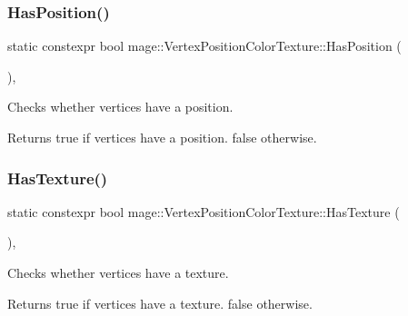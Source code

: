 \subsubsection{\texorpdfstring{Has\+Position()}{HasPosition()}}
{\footnotesize\ttfamily static constexpr bool mage\+::\+Vertex\+Position\+Color\+Texture\+::\+Has\+Position (\begin{DoxyParamCaption}{ }\end{DoxyParamCaption})\hspace{0.3cm}{\ttfamily [static]}, {\ttfamily [noexcept]}}

Checks whether vertices have a position.

\begin{DoxyReturn}{Returns}
{\ttfamily true} if vertices have a position. {\ttfamily false} otherwise. 
\end{DoxyReturn}
\hypertarget{structmage_1_1_vertex_position_color_texture_aac2da4c1e9233e6c480c4629718f0a1e}{}\label{structmage_1_1_vertex_position_color_texture_aac2da4c1e9233e6c480c4629718f0a1e} 
\subsubsection{\texorpdfstring{Has\+Texture()}{HasTexture()}}
{\footnotesize\ttfamily static constexpr bool mage\+::\+Vertex\+Position\+Color\+Texture\+::\+Has\+Texture (\begin{DoxyParamCaption}{ }\end{DoxyParamCaption})\hspace{0.3cm}{\ttfamily [static]}, {\ttfamily [noexcept]}}

Checks whether vertices have a texture.

\begin{DoxyReturn}{Returns}
{\ttfamily true} if vertices have a texture. {\ttfamily false} otherwise. 
\end{DoxyReturn}
\hypertarget{structmage_1_1_vertex_position_color_texture_a6b8d5ebc779ddf9f6e68dc83cb30fe0c}{}\label{structmage_1_1_vertex_position_color_texture_a6b8d5ebc779ddf9f6e68dc83cb30fe0c} 

